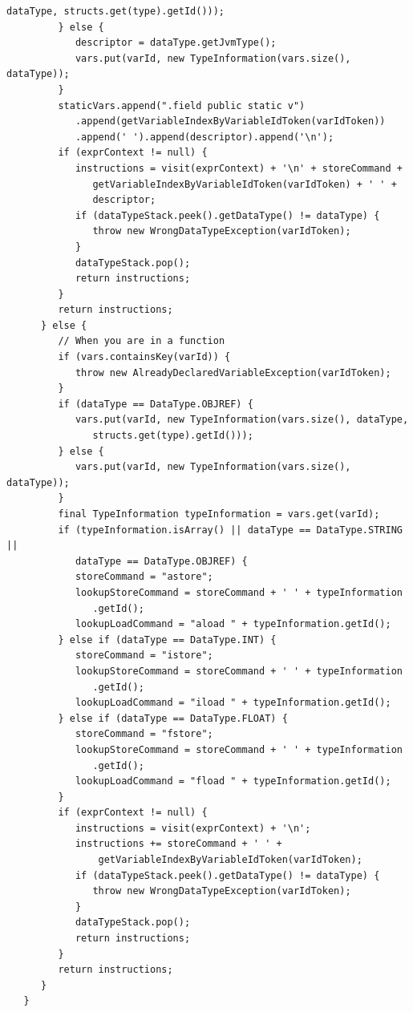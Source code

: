 \begin{lstlisting}[frame=htrbl, caption={Implementation of {\ttfamily EVisitor.java}}, label={lst:visitor}, basicstyle=\footnotesize]
               dataType, structs.get(type).getId()));
         } else {
            descriptor = dataType.getJvmType();
            vars.put(varId, new TypeInformation(vars.size(), dataType));
         }
         staticVars.append(".field public static v")
            .append(getVariableIndexByVariableIdToken(varIdToken))
            .append(' ').append(descriptor).append('\n');
         if (exprContext != null) {
            instructions = visit(exprContext) + '\n' + storeCommand +
               getVariableIndexByVariableIdToken(varIdToken) + ' ' + 
               descriptor;
            if (dataTypeStack.peek().getDataType() != dataType) {
               throw new WrongDataTypeException(varIdToken);
            }
            dataTypeStack.pop();
            return instructions;
         }
         return instructions;
      } else {
         // When you are in a function
         if (vars.containsKey(varId)) {
            throw new AlreadyDeclaredVariableException(varIdToken);
         }
         if (dataType == DataType.OBJREF) {
            vars.put(varId, new TypeInformation(vars.size(), dataType,
               structs.get(type).getId()));
         } else {
            vars.put(varId, new TypeInformation(vars.size(), dataType));
         }
         final TypeInformation typeInformation = vars.get(varId);
         if (typeInformation.isArray() || dataType == DataType.STRING || 
            dataType == DataType.OBJREF) {
            storeCommand = "astore";
            lookupStoreCommand = storeCommand + ' ' + typeInformation
               .getId();
            lookupLoadCommand = "aload " + typeInformation.getId();
         } else if (dataType == DataType.INT) {
            storeCommand = "istore";
            lookupStoreCommand = storeCommand + ' ' + typeInformation
               .getId();
            lookupLoadCommand = "iload " + typeInformation.getId();
         } else if (dataType == DataType.FLOAT) {
            storeCommand = "fstore";
            lookupStoreCommand = storeCommand + ' ' + typeInformation
               .getId();
            lookupLoadCommand = "fload " + typeInformation.getId();
         }
         if (exprContext != null) {
            instructions = visit(exprContext) + '\n';
            instructions += storeCommand + ' ' +
                getVariableIndexByVariableIdToken(varIdToken);
            if (dataTypeStack.peek().getDataType() != dataType) {
               throw new WrongDataTypeException(varIdToken);
            }
            dataTypeStack.pop();
            return instructions;
         }
         return instructions;
      }
   }


\end{lstlisting}
